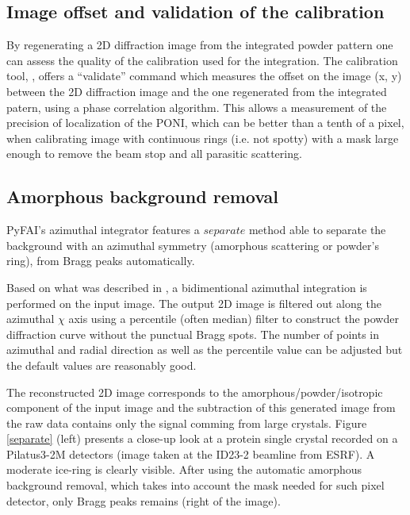\documentclass[preprint]{iucr}
\begin{document}
\subsection{Image offset and validation of the calibration}
By regenerating a 2D diffraction image from the integrated powder pattern one
can assess the quality of the calibration used for the integration.
The calibration tool, , offers  a ``validate'' command which
measures the offset on the image (x, y) between the 2D diffraction image and the
one regenerated from the integrated patern, using a phase correlation
algorithm.
This allows a measurement of the precision of localization of the PONI, which
can be better than a tenth of a pixel, when calibrating image with continuous
rings (i.e. not spotty) with a mask large enough to remove the beam stop and
all parasitic scattering.

\subsection{Amorphous background removal}

PyFAI's azimuthal integrator features a $separate$ method able to separate
the background with an azimuthal symmetry (amorphous scattering or powder's
ring), from Bragg peaks automatically.

Based on what was described in \cite{PyFAI_PDJ}, a bidimentional azimuthal
integration is performed on the input image.
The output 2D image is filtered out along the azimuthal $\chi$ axis using a
percentile (often median) filter to construct the powder diffraction curve
without the punctual Bragg spots.
The number of points in azimuthal and radial direction as well as
the percentile value can be adjusted but the default values are reasonably
good.

The reconstructed 2D image corresponds to the amorphous/powder/isotropic
component of the input image and the subtraction of this generated image from
the raw data contains only the signal comming from large crystals.
Figure \ref{separate} (left)
presents a close-up look at a protein single crystal recorded on a Pilatus3-2M
detectors (image taken at the ID23-2 beamline from ESRF). A
moderate ice-ring is clearly visible. 
After using the automatic amorphous background removal, which takes into account
the mask needed for such pixel detector, only Bragg peaks remains (right of the
image).
\end{document}
